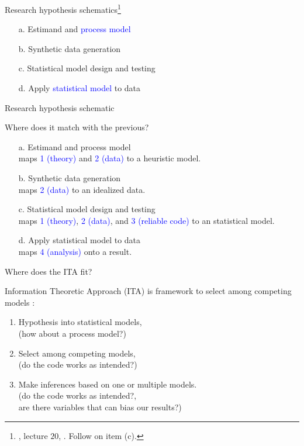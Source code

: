 \begin{lhframe}[rhgraphic={\texttt{[image: lab2.jpg]}}]
	{Research hypothesis schematics\footnote{\citet{McElreath_2022}, lecture $20$, \citet{Pearl_2019}. Follow \citet{Fogarty_et_al_2022} on item (c).}}
	
	\begin{enumerate}
		\item[a.] Estimand and \textcolor{blue}{process model}
		\item[b.] Synthetic data generation
		\item[c.] Statistical model design and testing
		\item[d.] Apply \textcolor{blue}{statistical model} to data 
	\end{enumerate} 
\end{lhframe}
%
%
\begin{lhframe}[rhgraphic={\texttt{[image: lab\_to\_research.png]}}]
	{Research hypothesis schematic}
	
	Where does it match with the previous?
	\begin{enumerate}
		\item[a.] Estimand and process model\\
		\small{maps \textcolor{blue}{1 (theory)} and \textcolor{blue}{2 (data)} to a heuristic model.}
		\item[b.] Synthetic data generation \\
		\small{maps \textcolor{blue}{2 (data)} to an idealized data.}
		\item[c.] Statistical model design and testing \\
		\small{maps \textcolor{blue}{1 (theory)}, \textcolor{blue}{2 (data)}, and \textcolor{blue}{3 (reliable code)} to an statistical model.}
		\item[d.] Apply statistical model to data \\
		\small{maps \textcolor{blue}{4 (analysis)} onto a result.}
	\end{enumerate} 
\end{lhframe}
%
%
\begin{lhframe}[rhgraphic={\texttt{[image: ITA\_to\_research.png]}}]
	{Where does the ITA fit?}
	
	Information Theoretic Approach (ITA) is framework to select among competing models \cite{Anderson_2008, Chamberlain_1965}:
	\begin{enumerate}
		\item Hypothesis into statistical models, \\
		{\small \alert{(how about a process model?)} }
		\item Select among competing models,  \\
		{\small \alert{(do the code works as intended?)} }
		\item Make inferences based on one or multiple models. \\
		{\small \alert{(do the code works as intended?, \\
				are there variables that can bias our results?)} }
	\end{enumerate}
\end{lhframe}
%
%
